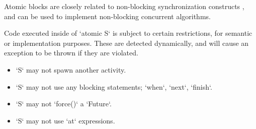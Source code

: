 

Atomic blocks are closely related to non-blocking synchronization
constructs \cite{herlihy91waitfree}, and can be used to implement 
non-blocking concurrent algorithms.

Code executed inside of \xcd`atomic S` is subject to certain
restrictions, for semantic or implementation purposes.  These are detected
dynamically, and will cause an exception to be thrown if they are violated. 
\begin{itemize}
\item \xcd`S` may not spawn another activity.
\item \xcd`S` may not use any blocking statements; \xcd`when`, \xcd`next`,
      \xcd`finish`.  
\item \xcd`S` may not \xcd`force()` a \xcd`Future`. 
\item \xcd`S` may not use \xcd`at` expressions.
\end{itemize}



